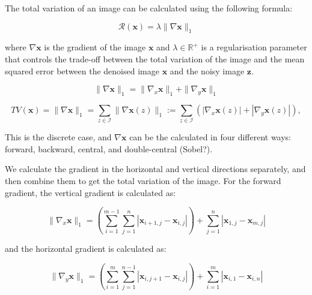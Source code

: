 \documentclass[12pt]{article}
\begin{document}

The total variation of an image can be calculated using the following formula:

\begin{equation}
  \mathcal{R}(\mathbf{x}) = \lambda \| \nabla \mathbf{x} \|_1
\end{equation}

where $\nabla \mathbf{x}$ is the gradient of the image $\mathbf{x}$ and $\lambda \in \mathbb{R}^{+}$ is a regularisation parameter that controls the trade-off between the total variation of the image and the mean squared error between the denoised image $\mathbf{x}$ and the noisy image $\mathbf{z}$.

\begin{equation}
  \| \nabla \mathbf{x} \|_1 = \| \nabla_x \mathbf{x} \|_1 + \| \nabla_y \mathbf{x} \|_1
\end{equation}

\begin{equation}
  TV(\mathbf{x}) = \|\nabla \mathbf{x}\|_1 = \sum_{z \in \mathcal{I}} \|\nabla \mathbf{x}(z)\|_1 := \sum_{z \in \mathcal{I}} \left( |\nabla_x \mathbf{x}(z)| + |\nabla_y \mathbf{x}(z)| \right),
\end{equation}


This is the discrete case, and $\nabla \mathbf{x}$ can be the calculated in four different ways: forward, backward, central, and double-central (Sobel?). 

We calculate the gradient in the horizontal and vertical directions separately, and then combine them to get the total variation of the image. 
For the forward gradient, the vertical gradient is calculated as:

\begin{equation}
  \| \nabla_x \mathbf{x} \|_1 = \left( \sum_{i=1}^{m-1} \sum_{j=1}^{n} |\mathbf{x}_{i+1,j} - \mathbf{x}_{i,j}| \right) + \sum_{j=1}^{n} |\mathbf{x}_{1, j} - \mathbf{x}_{m,j}|
\end{equation}

and the horizontal gradient is calculated as:

\begin{equation}
  \| \nabla_y \mathbf{x} \|_1 = \left( \sum_{i=1}^{m} \sum_{j=1}^{n-1} |\mathbf{x}_{i,j+1} - \mathbf{x}_{i,j}| \right) + \sum_{i=1}^{m} |\mathbf{x}_{i, 1} - \mathbf{x}_{i,n}|
\end{equation}
\end{document}
